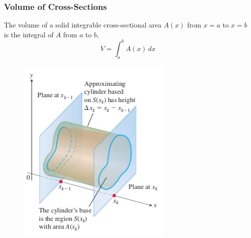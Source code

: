 \documentclass[xcolor=dvipsnames]{beamer}
\begin{document}

\begin{frame}
  \frametitle{Volume of Cross-Sections}
  The volume of a solid integrable cross-sectional area $A(x)$ from
  $x=a$ to $x=b$ is the integral of $A$ from $a$ to $b$,
  \begin{equation}
    \label{eq:upiecait}
    V=\int_{a}^{b}A(x)\,dx
  \end{equation}
  \begin{figure}[h]
    \includegraphics[scale=0.45]{./diagrams/crosssec.png}
  \end{figure}
\end{frame}
\end{document}
